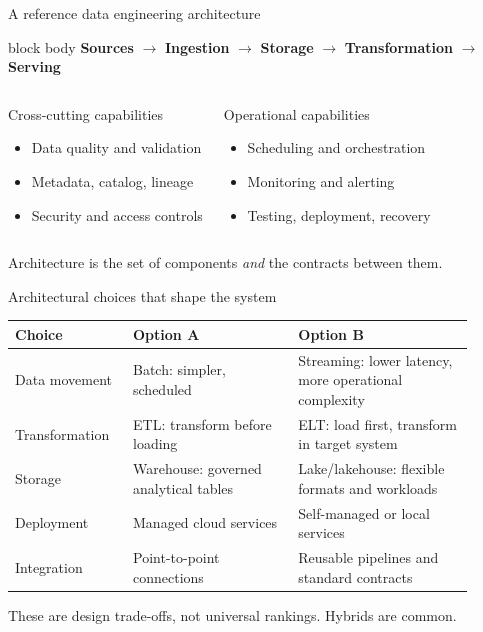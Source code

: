 \documentclass[aspectratio=43,10pt]{beamer}
\begin{document}
\begin{frame}{A reference data engineering architecture}
\centering
\begin{beamercolorbox}[wd=1.1\linewidth,sep=1em,center,rounded=true]{block body}
\textbf{Sources} $\longrightarrow$ \textbf{Ingestion} $\longrightarrow$
\textbf{Storage} $\longrightarrow$ \textbf{Transformation} $\longrightarrow$
\textbf{Serving}
\end{beamercolorbox}
\vspace{1em}
\begin{columns}[T]
\begin{block}{Cross-cutting capabilities}
\begin{itemize}
  \item Data quality and validation
  \item Metadata, catalog, lineage
  \item Security and access controls
\end{itemize}
\end{block}
\begin{block}{Operational capabilities}
\begin{itemize}
  \item Scheduling and orchestration
  \item Monitoring and alerting
  \item Testing, deployment, recovery
\end{itemize}
\end{block}
\end{columns}
\vspace{0.5em}
\small Architecture is the set of components \emph{and} the contracts between them.
\end{frame}

\begin{frame}{Architectural choices that shape the system}
\begin{tabular}{@{}p{0.23\linewidth}p{0.33\linewidth}p{0.35\linewidth}@{}}
\toprule
\textbf{Choice} & \textbf{Option A} & \textbf{Option B} \\
\midrule
Data movement & Batch: simpler, scheduled & Streaming: lower latency, more operational complexity \\
Transformation & ETL: transform before loading & ELT: load first, transform in target system \\
Storage & Warehouse: governed analytical tables & Lake/lakehouse: flexible formats and workloads \\
Deployment & Managed cloud services & Self-managed or local services \\
Integration & Point-to-point connections & Reusable pipelines and standard contracts \\
\bottomrule
\end{tabular}

\vspace{0.8em}
\small These are design trade-offs, not universal rankings. Hybrids are common.
\end{frame}
\end{document}
